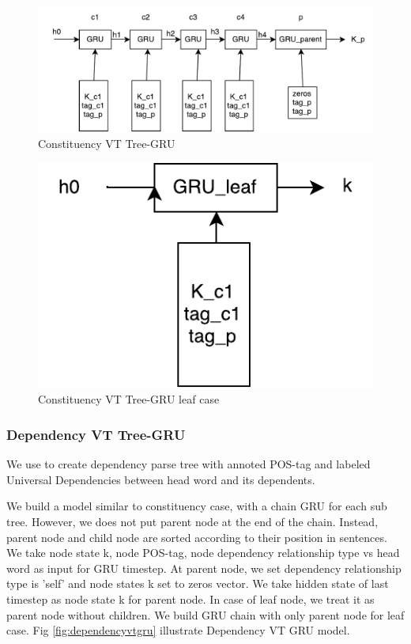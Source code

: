 \begin{figure}[H]
	\centering
	\includegraphics[width=0.9\linewidth]{figure/cvtgru}
	\caption[Constituency VT Tree-GRU]{Constituency VT Tree-GRU}
	\label{fig:cvtgru}
\end{figure}

\begin{figure}[H]
	\centering
	\includegraphics[width=0.4\linewidth]{figure/gruleaf}
	\caption[Constituency VT Tree-GRU leaf case]{Constituency VT Tree-GRU leaf case}
	\label{fig:gruleaf}
\end{figure}



\subsubsection{Dependency VT Tree-GRU} \label{sec:VTtreeDependency}
We use \cite{manning2014stanford} to create dependency parse tree with annoted POS-tag and labeled Universal Dependencies between head word and its dependents.

We build a model similar to constituency case, with a chain GRU for each sub tree. However, we does not put parent node at the end of the chain. Instead, parent node and child node are sorted according to their position in sentences. We take node state k, node POS-tag, node dependency relationship type vs head word as input for GRU timestep. At parent node, we set dependency relationship type is 'self' and node states k set to zeros vector. We take hidden state of last timestep as node state k for parent node. In case of leaf node, we treat it as parent node without children. We build GRU chain with only parent node for leaf case. Fig \ref{fig:dependencyvtgru} illustrate Dependency VT GRU model.

